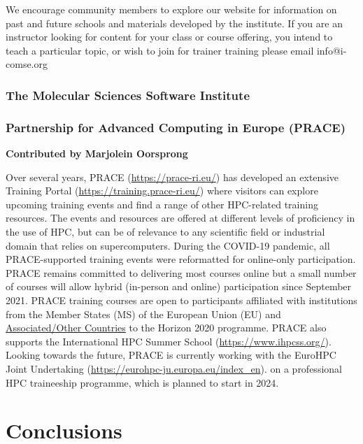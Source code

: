 \documentclass[9pt,review]{livecoms}
\begin{document}
 We encourage community members to explore our website for information on past and future schools and materials developed by the institute. If you are an instructor looking for content for your class or course offering, you intend to teach a particular topic, or wish to join for trainer training please email info@i-comse.org

\subsubsection{The Molecular Sciences Software Institute}


 \subsubsection{Partnership for Advanced Computing in Europe (PRACE)}

\textbf{Contributed by Marjolein Oorsprong}

Over several years, PRACE (\href{https://prace-ri.eu/}{https://prace-ri.eu/}) has developed an extensive Training Portal (\href{https://training.prace-ri.eu/}{https://training.prace-ri.eu/}) where visitors can explore upcoming training events and find a range of other HPC-related training resources.
The events and resources are offered at different levels of proficiency in the use of HPC, but can be of relevance to any scientific field or industrial domain that relies on supercomputers.
During the COVID-19 pandemic, all PRACE-supported training events were reformatted for online-only participation. 
PRACE remains committed to delivering most courses online but a small number of courses will allow hybrid (in-person and online) participation since September 2021.
PRACE training courses are open to participants affiliated with institutions from the Member States (MS) of the European Union (EU) and \href{https://ec.europa.eu/info/research-and-innovation/statistics/framework-programme-facts-and-figures/horizon-2020-country-profiles_en}{Associated/Other Countries} to the Horizon 2020 programme.
PRACE also supports the International HPC Summer School (\href{https://www.ihpcss.org/}{https://www.ihpcss.org/}).
Looking towards the future, PRACE is currently working with the EuroHPC Joint Undertaking 
(\href{https://eurohpc-ju.europa.eu/index_en}{https://eurohpc-ju.europa.eu/index\_en}).
on a professional HPC traineeship programme, which is planned to start in 2024.

\section{Conclusions}
\end{document}
